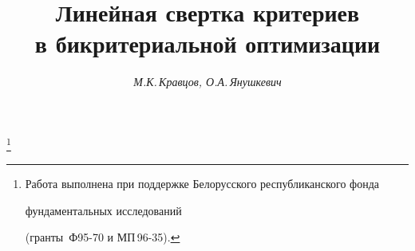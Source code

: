 



 


\newcommand{\la}{\langle} 


\newcommand{\ra}{\rangle} 


\newcommand{\argmin}{\operatorname{arg\,min}} 


\newcommand{\tts}[1]{} 


 




  


\setcounter{page}{63} 












\author{\it М.К.\,Кравцов, О.А.\,Янушкевич} 




\title{Линейная свертка критериев\\ в бикритериальной оптимизации} 


 


\thanks{Работа выполнена при поддержке Белорусского республиканского фонда


фундаментальных исследований 


(гранты \No\,Ф95-70 и МП\,96-35).} 


\date{} 




 


\pagestyle{plain} %


